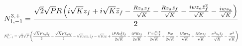 \documentclass[10pt]{article}
\begin{document}
\begin{equation*}
\resizebox{0.98\textwidth}{!}{${\displaystyle N^{3,+}_{1,-1}=\frac{\sqrt{2} \sqrt{P} R \left(i \sqrt{K} z_f + i \sqrt{K} \bar z_f - \frac{R z_a z_f}{\sqrt{K}} - \frac{R z_a \bar z_f}{\sqrt{K}} - \frac{i w z_a \bar z_f^{2}}{\sqrt{K}} - \frac{i w z_a}{\sqrt{K}}\right)}{2}}$}
\end{equation*}
\begin{equation*}
\resizebox{0.98\textwidth}{!}{${\displaystyle N^{3,-}_{1,-1}=\sqrt{2} \sqrt{P} \left(\frac{\sqrt{K} P z_a \bar z_f}{2} - \frac{\sqrt{K} P \bar z_a z_f}{2} - \sqrt{K} w z_a \bar z_f - \sqrt{K} w + \frac{i P R z_a^{2} \bar z_f}{2 \sqrt{K}} - \frac{i P R z_f}{2 \sqrt{K}} - \frac{P w z_a^{2} \bar z_f^{2}}{2 \sqrt{K}} + \frac{P w}{2 \sqrt{K}} + \frac{i R w z_a}{\sqrt{K}} + \frac{i R w z_f}{\sqrt{K}} - \frac{w^{2} z_a \bar z_f}{\sqrt{K}} - \frac{w^{2}}{\sqrt{K}}\right)}$}
\end{equation*}
\end{document}
